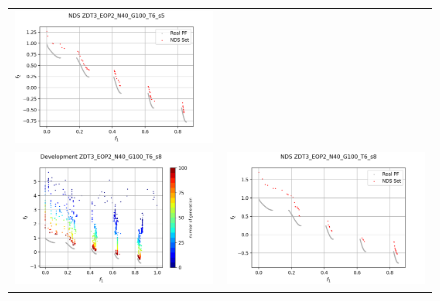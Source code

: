 \begin{figure}[H]
\begin{tabular}{c c}
    \includegraphics[scale=0.5]{figures/ZDT3_EOP2_N40_G100_T6/s5_nds.png}\\
    \includegraphics[scale=0.5]{figures/ZDT3_EOP2_N40_G100_T6/s8_dev.png} &
    \includegraphics[scale=0.5]{figures/ZDT3_EOP2_N40_G100_T6/s8_nds.png}\\

\end{tabular}
\end{figure}
